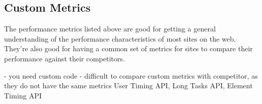 




\subsection{Custom Metrics}




The performance metrics listed above are good for getting a general understanding of the performance characteristics of most sites on the web. They're also good for having a common set of metrics for sites to compare their performance against their competitors.









- you need custom code
- difficult to compare custom metrics with competitor, as they do not have the same metrics
User Timing API, Long Tasks API, Element Timing API




